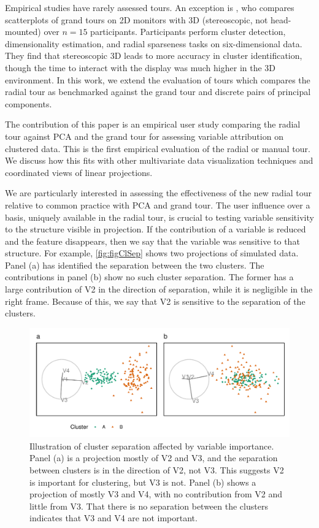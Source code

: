 \documentclass[review,journal]{vgtc}         %
\begin{document}
Empirical studies have rarely assessed tours. An exception is \cite{nelson_xgobi_1999}, who compares scatterplots of grand tours on 2D monitors with 3D (stereoscopic, not head-mounted) over \(n=15\) participants. Participants perform cluster detection, dimensionality estimation, and radial sparseness tasks on six-dimensional data. They find that stereoscopic 3D leads to more accuracy in cluster identification, though the time to interact with the display was much higher in the 3D environment. In this work, we extend the evaluation of tours which compares the radial tour as benchmarked against the grand tour and discrete pairs of principal components.

The contribution of this paper is an empirical user study comparing the radial tour against PCA and the grand tour for assessing variable attribution on clustered data. This is the first empirical evaluation of the radial or manual tour. We discuss how this fits with other multivariate data visualization techniques and coordinated views of linear projections.

We are particularly interested in assessing the effectiveness of the new radial tour relative to common practice with PCA and grand tour. The user influence over a basis, uniquely available in the radial tour, is crucial to testing variable sensitivity to the structure visible in projection. If the contribution of a variable is reduced and the feature disappears, then we say that the variable was sensitive to that structure. For example, \autoref{fig:figClSep} shows two projections of simulated data. Panel (a) has identified the separation between the two clusters. The contributions in panel (b) show no such cluster separation. The former has a large contribution of V2 in the direction of separation, while it is negligible in the right frame. Because of this, we say that V2 is sensitive to the separation of the clusters.

\begin{figure}

{\centering \includegraphics[width=1\linewidth]{./figures/figClSep} 

}

\caption{Illustration of cluster separation affected by variable importance. Panel (a) is a projection mostly of V2 and V3, and the separation between clusters is in the direction of V2, not V3. This suggests V2 is important for clustering, but V3 is not. Panel (b) shows a projection of mostly V3 and V4, with no contribution from V2 and little from V3. That there is no separation between the clusters indicates that V3 and V4 are not important.}\label{fig:figClSep}
\end{figure}
\end{document}
